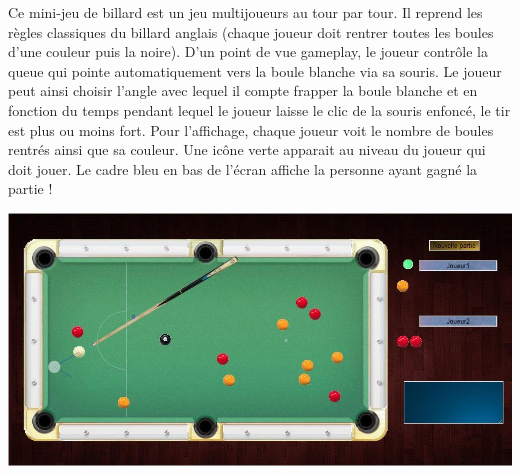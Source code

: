 \begin{minipage}{9cm}
Ce mini-jeu de billard est un jeu multijoueurs au tour par tour. 
Il reprend les règles classiques du billard anglais (chaque joueur doit rentrer toutes les boules d’une couleur puis la noire). 
D’un point de vue gameplay, le joueur contrôle la queue qui pointe automatiquement vers la boule blanche via sa souris. 
Le joueur peut ainsi choisir l’angle avec lequel il compte frapper la boule blanche et en fonction du temps pendant lequel
 le joueur laisse le clic de la souris enfoncé, le tir est plus ou moins fort. 
Pour l’affichage, chaque joueur voit le nombre de boules rentrés ainsi que sa couleur. 
Une icône verte apparait au niveau du joueur qui doit jouer. 
Le cadre bleu en bas de l’écran affiche la personne ayant gagné la partie !
\end{minipage}
\hfill
\begin{minipage}{6cm}
 \includegraphics[width=\linewidth]{img/capturejeu_billard}
\end{minipage}


